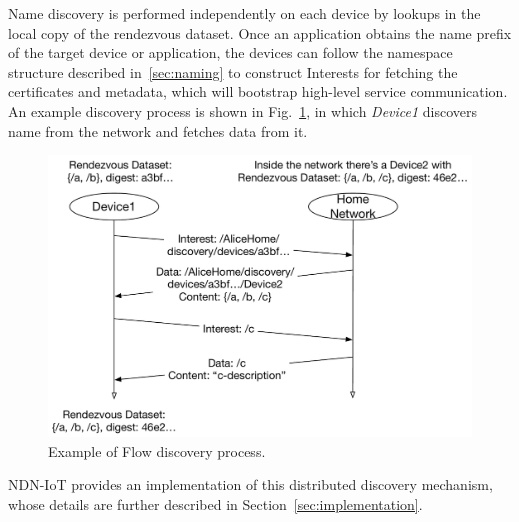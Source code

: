 Name discovery is performed independently on each device by lookups in the local copy of the rendezvous dataset.
Once an application obtains the name prefix of the target device or application, the devices can follow the namespace structure described in~\ref{sec:naming} to construct Interests for fetching the certificates and metadata, which will bootstrap high-level service communication. An example discovery process is shown in Fig.~\ref{fig:flow-discovery-process}, in which \textit{Device1} discovers name  from the network and fetches data from it.

\begin{figure}[!t]
\centering
\includegraphics[width=0.95\columnwidth]{flow-discovery-process.pdf}
\caption{Example of Flow discovery process.}
\label{fig:flow-discovery-process}
\end{figure}

NDN-IoT provides an implementation of this distributed discovery mechanism, whose details are further described in Section~\ref{sec:implementation}.